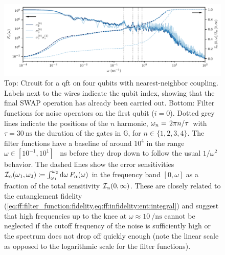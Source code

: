 \begin{figure}[tbp]
    \centering
    
    \includegraphics[width=\textwidth]{img/pdf/qft_filter_function_first_qubit_with_cumulative_fraction}
    \caption[\gls{qft} circuit and filter function]{
        Top: Circuit for a \gls{qft} on four qubits with nearest-neighbor coupling.
        Labels next to the wires indicate the qubit index, showing that the final SWAP operation has already been carried out.
        Bottom: Filter functions for noise operators on the first qubit ($i = 0$).
        Dotted grey lines indicate the positions of the $n$ harmonic, $\omega_n = \flatfrac{2\pi n}{\tau}$ with $\tau = \qty{30}{\nano\second}$ the duration of the gates in $\mathbb{G}$, for $n\in\lbrace 1, 2, 3, 4\rbrace$.
        The filter functions have a baseline of around $10^4$ in the range $\omega\in[10^{-1}, 10^{1}]$ \si{\per\nano\second} before they drop down to follow the usual $1/\omega^2$ behavior.
        The dashed lines show the error sensitivities $\mathcal{I}_\alpha(\omega_1,\omega_2)\coloneqq\int_{\omega_1}^{\omega_2}\dd{\omega} F_\alpha(\omega)$ in the frequency band $[0, \omega]$ as a fraction of the total sensitivity $\mathcal{I}_\alpha(0,\infty)$.
        These are closely related to the entanglement fidelity (\cf \cref{eq:ff:filter_function:fidelity,eq:ff:infidelity:ent:integral}) and suggest that high frequencies up to the knee at $\omega\approx\qty{10}{\per\nano\second}$ cannot be neglected if the cutoff frequency of the noise is sufficiently high or the spectrum does not drop off quickly enough (note the linear scale as opposed to the logarithmic scale for the filter functions).
    }
    \label{fig:ff:qft}
\end{figure}

